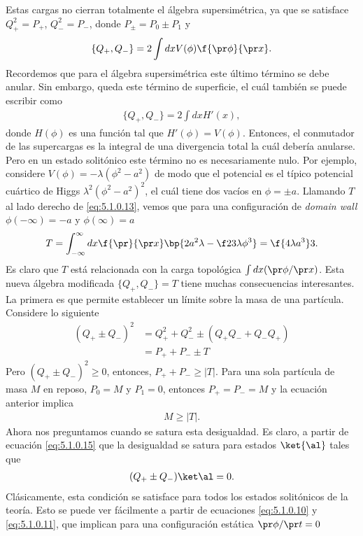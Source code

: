 Estas cargas no cierran totalmente el álgebra supersimétrica, ya que se satisface $Q_+^2 = P_+$, $Q_-^2 = P_-$, donde $P_{\pm}=P_0\pm P_1$ y
\begin{align}
	\{Q_+,Q_-\} = 2\int dxV(\phi)\f{\pr\phi}{\pr x}.
\end{align}
Recordemos que para el álgebra supersimétrica este último término se debe anular. Sin embargo, queda este término de superficie, el cuál también se puede escribir como
\begin{align}
	\{Q_+,Q_-\} = 2\int dx H'(x), \label{eq:5.1.0.13}
\end{align}
donde $H(\phi)$ es una función tal que $H'(\phi)=V(\phi)$. Entonces, el conmutador de las supercargas es la integral de una divergencia total la cuál debería anularse. Pero en un estado solitónico este término no es necesariamente nulo. Por ejemplo, considere $V(\phi)=-\lambda(\phi^2-a^2)$ de modo que el potencial es el típico potencial cuártico de Higgs $\lambda^2(\phi^2-a^2)^2$, el cuál tiene dos vacíos en $\phi=\pm a$. Llamando $T$ al lado derecho de \eqref{eq:5.1.0.13}, vemos que para una configuración de \emph{domain wall} $\phi(-\infty)=-a$ y $\phi(\infty)=a$
\begin{align}
	T = \int_{-\infty}^\infty dx\f{\pr}{\pr x}\bp{2a^2\lambda-\f 23\lambda\phi^3} =\f{4\lambda a^3}3.
\end{align}
Es claro que $T$ está relacionada con la carga topológica $\int dx(\pr\phi/\pr x)$. Esta nueva álgebra modificada $\{Q_+,Q_-\}=T$ tiene muchas consecuencias interesantes. La primera es que permite establecer un límite sobre la masa de una partícula. Considere lo siguiente
\begin{align}
	(Q_+\pm Q_-)^2 &= Q_+^2+Q_-^2\pm(Q_+Q_-+Q_-Q_+) \nonumber\\
				   &= P_++P_-\pm T \label{eq:5.1.0.15}
\end{align}
Pero $(Q_+\pm Q_-)^2\geq 0$, entonces, $P_++P_-\geq |T|$. Para una sola partícula de masa $M$ en reposo, $P_0=M$ y $P_1=0$, entonces $P_+=P_-=M$ y la ecuación anterior implica
\begin{align}
	M\geq |T|.
\end{align}
Ahora nos preguntamos cuando se satura esta desigualdad. Es claro, a partir de ecuación \eqref{eq:5.1.0.15} que la desigualdad se satura para estados $\ket{\al}$ tales que
\begin{align}
	(Q_+\pm Q_-)\ket\al =0.
\end{align}
Clásicamente, esta condición se satisface para todos los estados solitónicos de la teoría. Esto se puede ver fácilmente a partir de ecuaciones \eqref{eq:5.1.0.10} y \eqref{eq:5.1.0.11}, que implican para una configuración estática $\pr\phi/\pr t=0$
